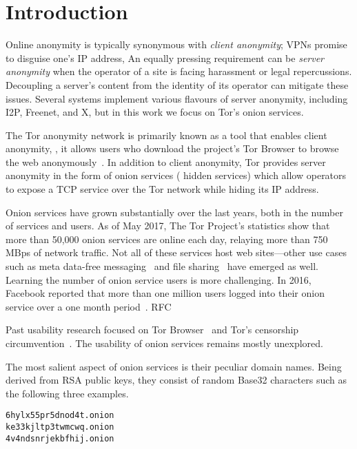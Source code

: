 \section{Introduction}
\label{sec:introduction}

Online anonymity is typically synonymous with \emph{client anonymity}; VPNs
promise to disguise one's IP address, An equally pressing requirement can be
\emph{server anonymity} when the operator of a site is facing harassment or legal
repercussions.  Decoupling a server's content from the identity of its operator
can mitigate these issues.  Several systems implement various flavours of server
anonymity, including I2P, Freenet, and X, but in this work we focus on Tor's
onion services.

The Tor anonymity network is primarily known as a tool that enables client
anonymity, \ie, it allows users who download the project's Tor Browser to
browse the web anonymously~\cite{Dingledine2004a}.  In addition to client
anonymity, Tor provides server anonymity in the form of onion services (\aka
hidden services) which allow operators to expose a TCP service over the Tor
network while hiding its IP address.

Onion services have grown substantially over the last years, both in the number
of services and users.  As of May 2017, The Tor Project's statistics show that
more than 50,000 onion services are online each day, relaying more than 750 MBps
of network traffic.  Not all of these services host web sites---other use cases
such as meta data-free messaging~\cite{ricochet} and file
sharing~\cite{onionshare} have emerged as well.  Learning the number of onion
service users is more challenging.  In 2016, Facebook reported that more than
one million users logged into their onion service over a one month
period~\cite{facebook-users}.
RFC~\cite{rfc7686}

Past usability research focused on Tor Browser~\cite{Clark2007a,Norcie2014a}
and Tor's censorship circumvention~\cite{Fifield2015a}.  The usability of onion
services remains mostly unexplored.

The most salient aspect of onion services is their peculiar domain names.
Being derived from RSA public keys, they consist of random Base32 characters
such as the following three examples.

{\footnotesize
\begin{verbatim}
6hylx55pr5dnod4t.onion
ke33kjltp3twmcwq.onion
4v4ndsnrjekbfhij.onion
\end{verbatim}
}

